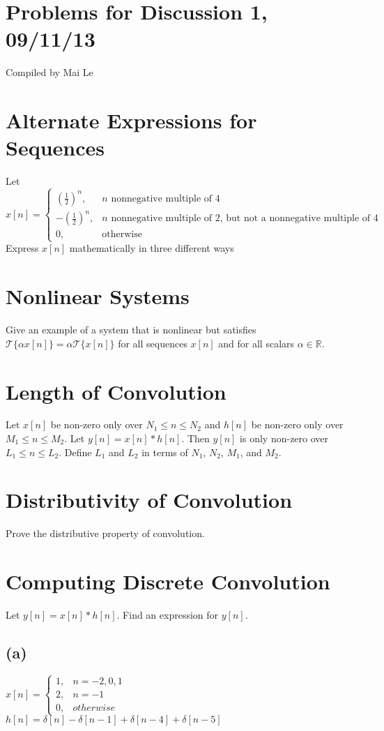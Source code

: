 \documentclass[11pt]{article}
\begin{document}
\section*{Problems for Discussion 1, 09/11/13}
Compiled by Mai Le

\section{Alternate Expressions for Sequences}
Let $x[n] = \begin{cases} \left(\frac{1}{2}\right)^n, & n \text{ nonnegative multiple of 4} \\ -\left(\frac{1}{2}\right)^n, & n \text{ nonnegative multiple of 2, but not a nonnegative multiple of 4} \\ 0, & \text{otherwise}\end{cases}$ \\
Express $x[n]$ mathematically in three different ways

\section{Nonlinear Systems}
Give an example of a system that is nonlinear but satisfies $\mathcal{T}\{\alpha x[n]\} = \alpha \mathcal{T}\{x[n]\}$ for all sequences $x[n]$ and for all scalars $\alpha \in \mathbb{R}$.

\section{Length of Convolution}
Let $x[n]$ be non-zero only over $N_1 \leq n \leq N_2$ and $h[n]$ be non-zero only over $M_1 \leq n \leq M_2$. Let $y[n]=x[n]*h[n]$. Then $y[n]$ is only non-zero over $L_1 \leq n \leq L_2$. Define $L_1$ and $L_2$ in terms of $N_1$, $N_2$, $M_1$, and $M_2$.

\section{Distributivity of Convolution}
Prove the distributive property of convolution.

\section{Computing Discrete Convolution}
Let $y[n]=x[n]*h[n]$. Find an expression for $y[n]$.
\subsection*{(a)}
$x[n] = \begin{cases} 1, & n = -2,0,1 \\ 2, & n = -1\\ 0, & otherwise \end{cases}$
\\
$h[n]=\delta[n]-\delta[n-1]+\delta[n-4]+\delta[n-5]$
\end{document}
